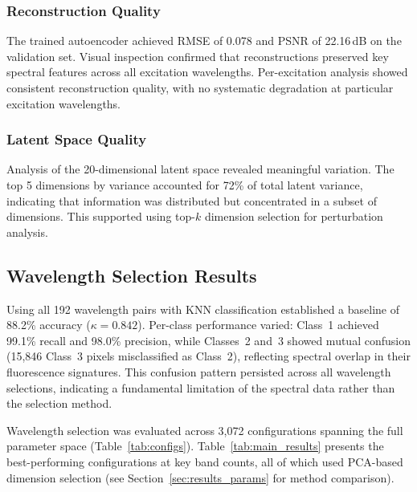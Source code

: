 \subsubsection{Reconstruction Quality}
The trained autoencoder achieved RMSE of 0.078 and PSNR of 22.16\,dB on the validation set.
Visual inspection confirmed that reconstructions preserved key spectral features across all excitation wavelengths.
Per-excitation analysis showed consistent reconstruction quality, with no systematic degradation at particular excitation wavelengths.

\subsubsection{Latent Space Quality}
Analysis of the 20-dimensional latent space revealed meaningful variation.
The top 5 dimensions by variance accounted for 72\% of total latent variance, indicating that information was distributed but concentrated in a subset of dimensions.
This supported using top-$k$ dimension selection for perturbation analysis.

\subsection{Wavelength Selection Results}
\label{sec:results_selection}

Using all 192 wavelength pairs with KNN classification established a baseline of 88.2\% accuracy ($\kappa = 0.842$).
Per-class performance varied: Class~1 achieved 99.1\% recall and 98.0\% precision, while Classes~2 and~3 showed mutual confusion (15,846 Class~3 pixels misclassified as Class~2), reflecting spectral overlap in their fluorescence signatures.
This confusion pattern persisted across all wavelength selections, indicating a fundamental limitation of the spectral data rather than the selection method.

Wavelength selection was evaluated across 3,072 configurations spanning the full parameter space (Table~\ref{tab:configs}).
Table~\ref{tab:main_results} presents the best-performing configurations at key band counts, all of which used PCA-based dimension selection (see Section~\ref{sec:results_params} for method comparison).

